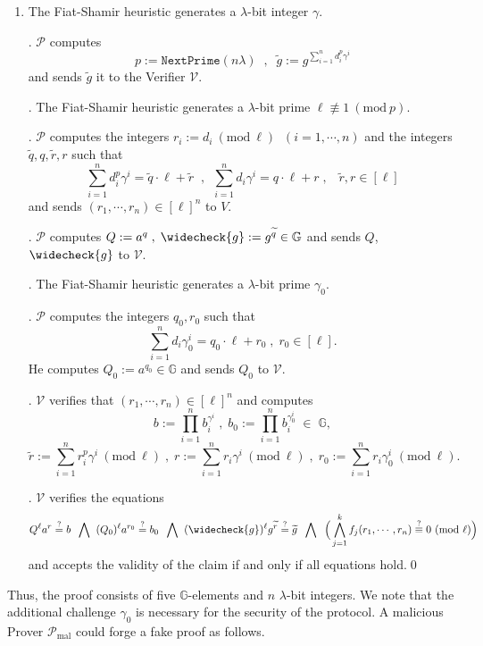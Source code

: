\documentclass[11pt, lettersize, notitlepage, leqno, footskip=0.6cm]{article}
\newcommand{\pl}{\prod\limits}
\newcommand{\slim}{\sum\limits}
\newcommand{\ttt}{\texttt}
\newcommand{\bG}{\mathbb{G}}
\newcommand{\wti}{\widetilde}
\newcommand{\mc}{\mathcal}
\newcommand{\mb}{\mathbb}
\newcommand{\mr}{\mathrm}
\newcommand{\lam}{\lambda}
\newcommand{\weck}{\widecheck}
\newcommand{\mP}{\mc{P}}
\newcommand{\V}{\mc{V}}
\newcommand{\vs}{\vspace{-0.15cm}}
\newcommand{\noin}{\noindent}
\newcommand{\sta}{\stackrel{?}{=}}
\newcommand{\Mod}[1]{\ (\mathrm{mod}\ #1)}
\numberwithin{equation}{section}
\begin{document}
\begin{enumerate}[wide, labelwidth=!, labelindent=0pt]\vs \item The Fiat-Shamir heuristic generates a $\lam$-bit integer $\gamma$.

. $\mc{P}$ computes \vs $$p:= \ttt{NextPrime}(n\lam)\;\;,\;\;\wti{g} :=g^{\sum\limits_{i=1}^n d_i^{p}\gamma^i}$$ and sends $\wti{g}$ it to the Verifier $\mc{V}$.

. The Fiat-Shamir heuristic generates a $\lam$-bit prime $\ell\not\equiv 1\Mod{p}$.
 
. $\mc{P}$ computes the integers $r_i:=d_i\Mod{\ell}\;\; (i=1,\cdots, n)$ and the integers $\wti{q}, q, \wti{r}, r$ such that \vs $$\slim_{i=1}^n d_i^{p}\gamma^i = \wti{q} \cdot \ell+\wti{r}\;\;,\:\;\slim_{i=1}^n d_i\gamma^i = q \cdot \ell+r\;,\;\;\;\wti{r}, r\in [\ell] $$ and sends $(r_1,\cdots,r_n)\in [\ell]^n$ to $V$.

\noin 5. $\mP$ computes $Q:= a^q\;,\;\weck{g}:= g^{\wti{q}}\in \bG$ and sends $Q$, $\weck{g}$ to  $\V$. 

\noin 6. The Fiat-Shamir heuristic generates a $\lam$-bit prime $\gamma_{0}$.

\noin 7. $\mP$ computes the integers $q_0, r_0$ such that \vs $$\slim_{i=1}^n d_i\gamma_{0}^i = q_0 \cdot \ell+r_0\;,\;r_0\in[\ell] .$$ He computes $Q_0:= a^{q_{0}}\in \bG$ and sends $Q_0$ to $\V$.

. $\mc{V}$ verifies that $(r_1,\cdots,r_n)\in [\ell]^n$ and computes \vs $$b := \pl_{i=1}^n b_i^{\gamma^i}\;,\;b_0 := \pl_{i=1}^n b_i^{\gamma_{0}^i}\;\in \;\bG,$$ \vspace{-0.2cm} $$\wti{r}:= \slim_{i=1}^n r_i^{p}\gamma^i\Mod{\ell}\;,\;r:= \slim_{i=1}^n r_i\gamma^i\Mod{\ell}\;,\;r_0:=\slim_{i=1}^n r_i\gamma_{0}^i\Mod{\ell}.$$ 

. $\mc{V}$ verifies the equations \vs $$ Q^{\ell} a^{r} \sta b \;\;\bigwedge\;\;(Q_0)^{\ell} a^{r_{0}} \sta b_0 \;\;\bigwedge\;\; (\weck{g})^{\ell}g^{\wti{r}} \stackrel{?}{=}\wti{g} \;\;\bigwedge\;\;\Big( \bigwedge\limits_{j=1}^k  f_j(r_1,\cdots,r_n) \stackrel{?}{\equiv} 0\Mod{\ell} \Big)$$ and accepts the validity of the claim if and only if all equations hold.\qed \end{enumerate}


\vspace{0.1cm}

Thus, the proof consists of five $\mb{G}$-elements and $n$ $\lam$-bit integers. We note that the additional challenge $\gamma_{0}$ is necessary for the security of the protocol. A malicious Prover $\mP_{\mr{mal}}$ could forge a fake proof as follows.
\end{document}
